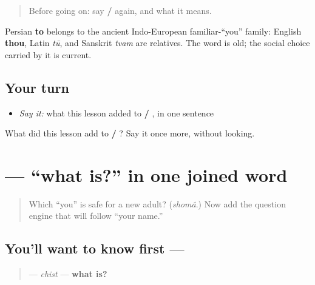 \label{lesson:FA-C03-shoma-to-more}



\begin{quote}
Before going on: say \textbf{ / } again, and what it means.
\end{quote}

\begin{cousinweb}
Persian \textbf{to} belongs to the ancient Indo-European familiar-“you” family: English \textbf{thou}, Latin \emph{tū}, and Sanskrit \emph{tvam} are relatives. The word is old; the social choice carried by it is current.
\end{cousinweb}

\subsection*{Your turn}
\begin{itemize}
\raggedright
  \item \emph{Say it:} what this lesson added to \textbf{ / }, in one sentence
\end{itemize}

\begin{tcolorbox}[breakable,colback=teal!4,colframe=teal!35!black,title={Before you move on}]
What did this lesson add to \textbf{ / }? Say it once more, without looking.
\end{tcolorbox}
\section[\texorpdfstring{\fa{چیست} (chist)}{چیست (chist)}]{ — “what is?” in one joined word}

\label{lesson:FA-C03-chist}



\begin{quote}
Which “you” is safe for a new adult? (\emph{shomâ}.) Now add the question engine that will follow “your name.”
\end{quote}

\subsection*{You'll want to know first — }

\begin{quote}
\textbf{} — \emph{chist} — \textbf{what is?}
\end{quote}

